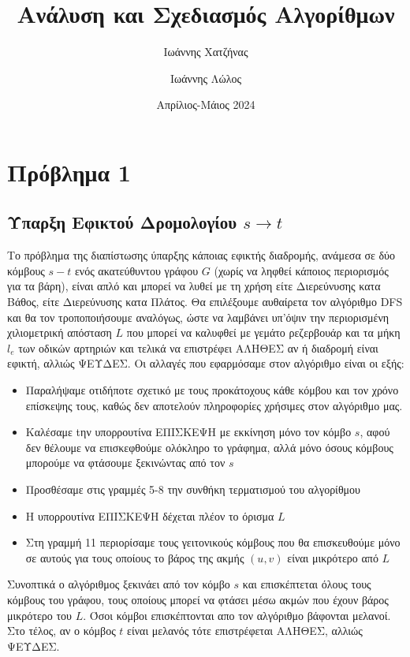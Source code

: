 \documentclass{article}
\title{Ανάλυση και Σχεδιασμός Αλγορίθμων}
\author{Ιωάννης Χατζήνας \and Ιωάννης Λώλος}
\date{Απρίλιος-Μάιος 2024}
\begin{document}
\maketitle

\section*{Πρόβλημα 1}
\subsection*{Ύπαρξη Εφικτού Δρομολογίου ${s\rightarrow t}$}
Το πρόβλημα της διαπίστωσης ύπαρξης κάποιας εφικτής διαδρομής, ανάμεσα σε δύο κόμβους $ s-t $ ενός ακατεύθυντου γράφου $ G $ (χωρίς να ληφθεί κάποιος περιορισμός για τα βάρη), είναι απλό και μπορεί να λυθεί με τη χρήση είτε Διερεύνυσης κατα Βάθος, είτε Διερεύνυσης κατα Πλάτος. Θα επιλέξουμε αυθαίρετα τον αλγόριθμο \foreignlanguage{english}{DFS}\cite{cormen_dfs} και θα τον τροποποιήσουμε αναλόγως, ώστε να λαμβάνει υπ'όψιν την περιορισμένη χιλιομετρική απόσταση $ L $ που μπορεί να καλυφθεί με γεμάτο ρεζερβουάρ και τα μήκη $ l_e $ των οδικών αρτηριών και τελικά να επιστρέφει ΑΛΗΘΕΣ αν ή διαδρομή είναι εφικτή, αλλιώς ΨΕΥΔΕΣ. Οι αλλαγές που εφαρμόσαμε στον αλγόριθμο είναι οι εξής:
\begin{itemize}
    \item Παραλήψαμε οτιδήποτε σχετικό με τους προκάτοχους κάθε κόμβου και τον χρόνο επίσκεψης τους, καθώς δεν αποτελούν πληροφορίες χρήσιμες στον αλγόριθμο μας.
    \item Καλέσαμε tην υπορρουτίνα ΕΠΙΣΚΕΨΗ με εκκίνηση μόνο τον κόμβο $ s $, αφού δεν θέλουμε να επισκεφθούμε ολόκληρο το γράφημα, αλλά μόνο όσους κόμβους μπορούμε να φτάσουμε ξεκινώντας από τον $ s $ 
    \item Προσθέσαμε στις γραμμές 5-8 την συνθήκη τερματισμού του αλγορίθμου
    \item Η υπορρουτίνα ΕΠΙΣΚΕΨΗ δέχεται πλέον το όρισμα $ L $
    \item Στη γραμμή 11 περιορίσαμε τους γειτονικούς κόμβους που θα επισκευθούμε μόνο σε αυτούς για τους οποίους το βάρος της ακμής $ (u, v)$ είναι μικρότερο από $ L $
\end{itemize}
Συνοπτικά ο αλγόριθμος ξεκινάει από τον κόμβο $ s $ και επισκέπτεται όλους τους κόμβους του γράφου, τους οποίους μπορεί να φτάσει μέσω ακμών που έχουν βάρος μικρότερο του $ L $. Όσοι κόμβοι επισκέπτονται απο τον αλγόριθμο βάφονται μελανοί. Στο τέλος, αν ο κόμβος $ t $ είναι μελανός τότε επιστρέφεται ΑΛΗΘΕΣ, αλλιώς ΨΕΥΔΕΣ.
\end{document}
